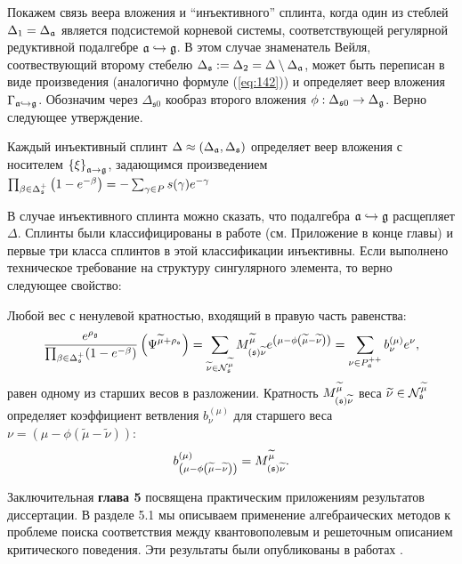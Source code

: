 \documentclass[14pt,autoref,href,facsimile
]{disser}
\begin{document}
Покажем связь веера вложения и ``инъективного'' сплинта, когда один из стеблей $\Delta _{1}=\Delta _{\mathfrak{a}}$  является подсистемой корневой системы, соответствующей регулярной редуктивной подалгебре $\mathfrak{a}\hookrightarrow \mathfrak{g}$. В этом случае знаменатель Вейля, соотвествующий второму стебелю $\Delta _{\mathfrak{s}}:=\Delta_{2}=\Delta \setminus \Delta _{\mathfrak{a}}$, может быть переписан в виде произведения (аналогично формуле (\ref{eq:142})) и определяет веер вложения  $\Gamma _{\mathfrak{a}\hookrightarrow \mathfrak{g}}$. Обозначим через $\Delta_{\mathfrak{s}0}$ кообраз второго вложения $\phi:\Delta_{\mathfrak{s}0}\to \Delta_{\mathfrak{g}}$. Верно следующее утверждение.
\vspace{-0.3cm}
\begin{statement}
Каждый инъективный сплинт $\Delta \approx (\Delta _{\mathfrak{a}},\Delta _{\mathfrak{s}})$ определяет веер вложения с носителем $\left\{ \xi \right\} _{\mathfrak{a}\rightarrow \mathfrak{g}}$, задающимся произведением\\
$
\prod_{\beta \in \Delta _{\mathfrak{s}}^{+}}\left( 1-e^{-\beta }\right)
=-\sum_{\gamma \in P}s(\gamma )e^{-\gamma }$
\end{statement}
В случае инъективного сплинта можно сказать, что подалгебра $\mathfrak{a}\hookrightarrow \mathfrak{g}$ расщепляет $\Delta$.  Сплинты были классифицированы в работе \cite{richter2008splints}  (см. Приложение в конце главы) и первые три класса сплинтов в этой классификации инъективны. Если выполнено техническое требование на структуру сингулярного элемента, то верно следующее свойство:
\vspace{-0.3cm}
\begin{Prop}
Любой вес с ненулевой кратностью, входящий в правую часть равенства:
\[
\frac{e^{\rho _{\gf}}}{\prod_{\beta \in \Delta _{\sfr%
}^{+}}(1-e^{-\beta })}\left( \Psi ^{\widetilde{\mu }+\rho _{\sfr%
}}\right) =\sum_{\widetilde{\nu }\in \mathcal{N}_{\sfr}^{\widetilde{\mu }%
}}M_{\left( \sfr\right) \widetilde{\nu }}^{\widetilde{\mu }}e^{\left(
\mu -\phi \left( \widetilde{\mu }-\widetilde{\nu }\right) \right)
}=\sum_{\nu \in P_{\af}^{++}}b_{\nu }^{(\mu )}e^{\nu },
\]
равен одному из старших весов в разложении. Кратность $M_{\left( \mathfrak{s}
\right) \widetilde{\nu }}^{\widetilde{\mu }}$ веса  $\widetilde{\nu}\in \mathcal{N}_{\mathfrak{s}}^{\widetilde{\mu }}$ определяет коэффициент ветвления  $b_{\nu }^{(\mu )}$ для старшего веса $\nu =\left( \mu-\phi \left( \widetilde{\mu }-\widetilde{\nu }\right) \right) $:
\[
b_{\left( \mu -\phi \left( \widetilde{\mu }-\widetilde{\nu }\right) \right)
}^{(\mu )}=M_{\left( \mathfrak{s}\right) \widetilde{\nu }}^{\widetilde{\mu }}.
\]
\end{Prop}
Заключительная \textbf{глава 5} посвящена практическим приложениям результатов диссертации.
 В разделе 5.1 мы  описываем применение алгебраических методов к проблеме поиска соответствия между квантовополевым и решеточным описанием критического поведения. Эти результаты были опубликованы в работах .
\end{document}
